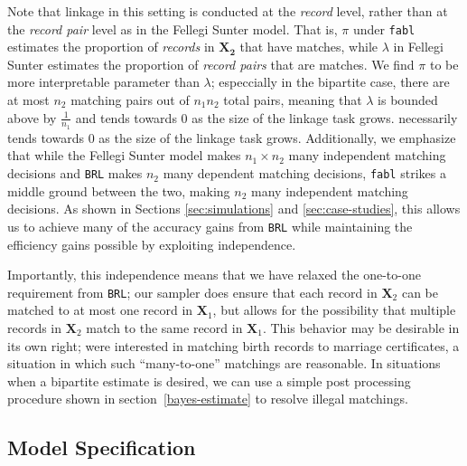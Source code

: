 \documentclass[12pt,letterpaper]{article}
\newcommand{\1}[1]{\mathbb{I}\!\left[#1\right]} %
\begin{document}
Note that linkage in this setting is conducted at the \emph{record} level, rather than at the \emph{record pair} level as in the Fellegi Sunter model. That is, $\pi$ under \texttt{fabl} estimates the proportion of \emph{records} in $\bm{X_2}$ that have matches, while $\lambda$ in Fellegi Sunter estimates the proportion of \emph{record pairs} that are matches. We find $\pi$ to be more interpretable parameter than $\lambda$; especcially in the bipartite case, there are at most $n_2$ matching pairs out of $n_1 n_2$ total pairs, meaning that $\lambda$ is bounded above by $\frac{1}{n_1}$ and tends towards 0 as the size of the linkage task grows.  necessarily tends towards 0 as the size of the linkage task grows. Additionally, we emphasize that while the Fellegi Sunter model makes $n_1 \times n_2$ many independent matching decisions and \texttt{BRL} makes $n_2$ many dependent matching decisions, \texttt{fabl} strikes a middle ground between the two, making $n_2$ many independent matching decisions. As shown in Sections \ref{sec:simulations} and \ref{sec:case-studies}, this allows us to achieve many of the accuracy gains from \texttt{BRL} while maintaining the efficiency gains possible by exploiting independence. 

Importantly, this independence means that we have relaxed the one-to-one requirement from \texttt{BRL}; our sampler does ensure that each record in \(\bm{X}_2\) can be matched to at most one record in \(\bm{X}_1\), but allows for the possibility that multiple records in \(\bm{X}_2\) match to the same record in \(\bm{X}_1\). This behavior may be desirable in its own right; \cite{Newcombe1962b} were interested in matching birth records to marriage certificates, a situation in which such ``many-to-one'' matchings are reasonable. In situations when a bipartite estimate is desired, we can use a simple post processing procedure shown in  section~\ref{bayes-estimate} to resolve illegal matchings.  


\hypertarget{fabl-model}{%
	\subsection{Model Specification}
	\label{model-specification}} 
\end{document}
